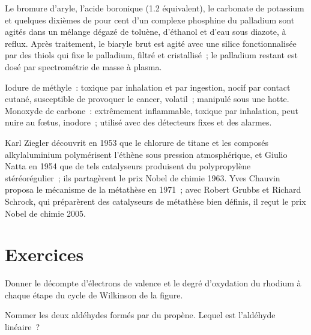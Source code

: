 \begin{inthelab}
Le bromure d'aryle, l'acide boronique (1.2 équivalent), le carbonate de
potassium et quelques dixièmes de pour cent d'un complexe phosphine du
palladium sont agités dans un mélange dégazé de toluène, d'éthanol et d'eau
sous diazote, à reflux. Après traitement, le biaryle brut est agité avec
une silice fonctionnalisée par des thiols qui fixe le palladium, filtré et
cristallisé~; le palladium restant est dosé par spectrométrie de masse à
plasma.
\end{inthelab}

\begin{safety}{}
Iodure de méthyle~: toxique par inhalation et par ingestion, nocif par
contact cutané, susceptible de provoquer le cancer, volatil~; manipulé sous
une hotte. Monoxyde de carbone~: extrêmement inflammable, toxique par
inhalation, peut nuire au fœtus, inodore~; utilisé avec des détecteurs
fixes et des alarmes.
\end{safety}

\begin{history}
Karl Ziegler découvrit en 1953 que le chlorure de titane et les composés
alkylaluminium polymérisent l'éthène sous pression atmosphérique, et Giulio
Natta en 1954 que de tels catalyseurs produisent du polypropylène
stéréorégulier~; ils partagèrent le prix Nobel de chimie 1963. Yves Chauvin
proposa le mécanisme  de la métathèse en 1971~; avec
Robert Grubbs et Richard Schrock, qui préparèrent des catalyseurs de
métathèse bien définis, il reçut le prix Nobel de chimie 2005.
\end{history}

\section{Exercices}

\begin{exercise}[$\star$]\label{exo:b3:homogeneous-catalysis:1}
Donner le décompte d'électrons de valence et le degré d'oxydation du rhodium
à chaque étape du cycle de Wilkinson de la figure.
\end{exercise}

\begin{exercise}[$\star$]\label{exo:b3:homogeneous-catalysis:2}
Nommer les deux aldéhydes formés par  du propène. Lequel
est l'aldéhyde linéaire~?
\end{exercise}

